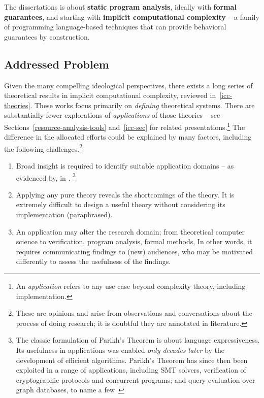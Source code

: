 \begin{mdframed}[backgroundcolor=conceptbase,linecolor=concept,nobreak=true]
The dissertations is about \textbf{static program analysis}, ideally with
\textbf{formal guarantees}, and starting with \textbf{implicit computational
complexity} -- a family of programming language-based techniques that can
provide behavioral guarantees by construction.
\end{mdframed}

\subsection{Addressed Problem}
\label{subsec:problem}

Given the many compelling ideological perspectives, there exists a long series
of theoretical results in implicit computational complexity, reviewed
in~\autoref{icc-theories}. These works focus primarily on \emph{defining}
theoretical systems. There are substantially fewer explorations of
\emph{applications} of those theories -- see
Sections~\ref{resource-analysis-tools} and~\ref{icc-sec} for related
presentations.\footnote{An \emph{application} refers to any use case beyond
complexity theory, including implementation.} The difference in the allocated
efforts could be explained by many factors, including the following
challenges.\footnote{These are opinions and arise from observations and
conversations about the process of doing research; it is doubtful they are
annotated in literature.}

\begin{enumerate}

\item Broad insight is required to identify suitable application domains -- as
      evidenced by, \eg {} in .%
      \footnote{The classic formulation of Parikh's Theorem is about language
      expressiveness. Its usefulness in applications was enabled \emph{only
      decades later} by the development of efficient algorithms. Parikh's
      Theorem has since then been exploited in a range of applications,
      including SMT solvers, verification of cryptographic protocols and
      concurrent programs; and query evaluation over graph databases, to name a
      few~\cite[pg. 2]{hague2024}}

\item Applying any pure theory reveals the shortcomings of the theory.
      It is extremely difficult to design a useful theory without considering
      its implementation (paraphrased).

\item An application may alter the research domain; \eg from theoretical
      computer science to verification, program analysis, formal methods, \etc
      In other words, it requires communicating findings to (new) audiences, who
      may be motivated differently to assess the usefulness of the findings.

\end{enumerate}

